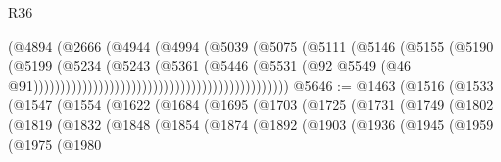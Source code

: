 \begin{lexlean}{R36}
\begin{coremodule}
                                                              (@4894
                                                                (@2666
                                                                  (@4944
                                                                    (@4994
                                                                      (@5039
                                                                        (@5075
                                                                          (@5111
                                                                            (@5146
                                                                              (@5155
                                                                                (@5190
                                                                                  (@5199
                                                                                    (@5234
                                                                                      (@5243
                                                                                        (@5361
                                                                                          (@5446
                                                                                            (@5531
                                                                                              (@92
                                                                                                @5549
                                                                                                (@46
                                                                                                  @91)))))))))))))))))))))))))))))))))))))))))))))))
@5646 := @1463
    (@1516
      (@1533
        (@1547
          (@1554
            (@1622
              (@1684
                (@1695
                  (@1703
                    (@1725
                      (@1731
                        (@1749
                          (@1802
                            (@1819
                              (@1832
                                (@1848
                                  (@1854
                                    (@1874
                                      (@1892
                                        (@1903
                                          (@1936
                                            (@1945
                                              (@1959
                                                (@1975
                                                  (@1980

\end{coremodule}
\end{lexlean}
